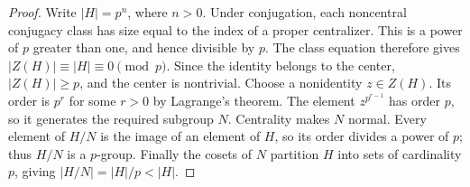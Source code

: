 \begin{proof}
Write $|H|=p^n$, where $n>0$. Under conjugation, each
noncentral conjugacy class has size equal to the index of a
proper centralizer. This is a power of $p$ greater than one,
and hence divisible by $p$. The class equation therefore gives
$|Z(H)|\equiv |H|\equiv0\pmod p$. Since the identity belongs
to the center, $|Z(H)|\ge p$, and the center is nontrivial.
Choose a nonidentity $z\in Z(H)$. Its order is $p^r$ for
some $r>0$ by Lagrange's theorem. The element $z^{p^{r-1}}$
has order $p$, so it generates the required subgroup $N$.
Centrality makes $N$ normal. Every element of $H/N$ is the
image of an element of $H$, so its order divides a power of
$p$; thus $H/N$ is a $p$-group. Finally the cosets of $N$
partition $H$ into sets of cardinality $p$, giving
$|H/N|=|H|/p<|H|$.
\end{proof}
